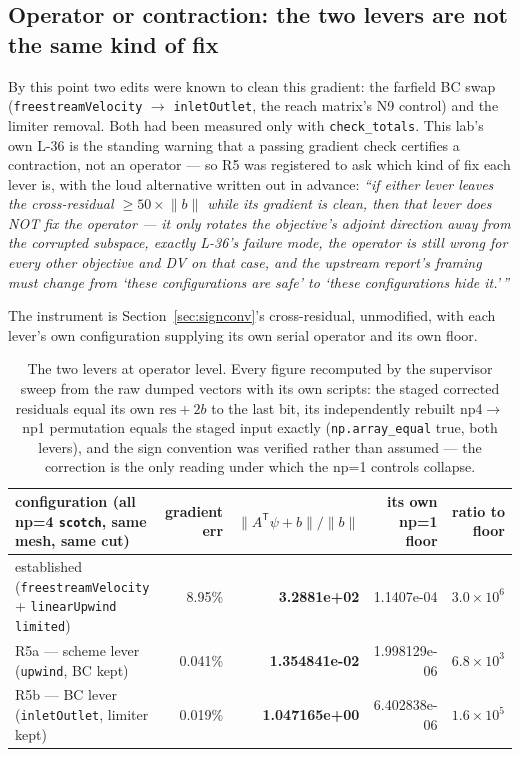 \documentclass[11pt,a4paper]{article}
\begin{document}
\subsection{Operator or contraction: the two levers are not the same kind of fix}
\label{sec:levers}

By this point two edits were known to clean this gradient: the farfield BC swap
(\texttt{freestreamVelocity} \(\rightarrow\) \texttt{inletOutlet}, the reach matrix's N9
control) and the limiter removal. Both had been measured only with \texttt{check\_totals}.
This lab's own L-36 is the standing warning that a passing gradient check certifies a
contraction, not an operator --- so R5 was registered to ask which kind of fix each lever is,
with the loud alternative written out in advance: \emph{``if either lever leaves the
cross-residual \(\ge 50\times\lVert b\rVert\) while its gradient is clean, then that lever
does NOT fix the operator --- it only rotates the objective's adjoint direction away from the
corrupted subspace, exactly L-36's failure mode, the operator is still wrong for every other
objective and DV on that case, and the upstream report's framing must change from `these
configurations are safe' to `these configurations hide it.'\,''}

The instrument is Section~\ref{sec:signconv}'s cross-residual, unmodified, with each lever's
own configuration supplying its own serial operator and its own floor.

\begin{table}[htbp]
\centering\footnotesize
\begin{tabular}{@{}L{5.4cm}rrrr@{}}
\toprule
configuration (all np=4 \texttt{scotch}, same mesh, same cut) & gradient err & \(\lVert A^{\mathsf T}\psi + b\rVert / \lVert b\rVert\) & its own np=1 floor & ratio to floor \\
\midrule
established (\texttt{freestreamVelocity} + \texttt{linearUpwind limited}) & 8.95\% & \textbf{3.2881e+02} & 1.1407e-04 & \(3.0\times10^{6}\) \\
R5a --- scheme lever (\texttt{upwind}, BC kept) & 0.041\% & \textbf{1.354841e-02} & 1.998129e-06 & \(6.8\times10^{3}\) \\
R5b --- BC lever (\texttt{inletOutlet}, limiter kept) & 0.019\% & \textbf{1.047165e+00} & 6.402838e-06 & \(1.6\times10^{5}\) \\
\bottomrule
\end{tabular}
\caption{The two levers at operator level. Every figure recomputed by the supervisor sweep
from the raw dumped vectors with its own scripts: the staged corrected residuals equal its
own \(\mathrm{res}+2b\) to the last bit, its independently rebuilt np4\(\rightarrow\)np1
permutation equals the staged input exactly (\texttt{np.array\_equal} true, both levers), and
the sign convention was verified rather than assumed --- the correction is the only reading
under which the np=1 controls collapse.}
\label{tab:levers}
\end{table}
\end{document}
